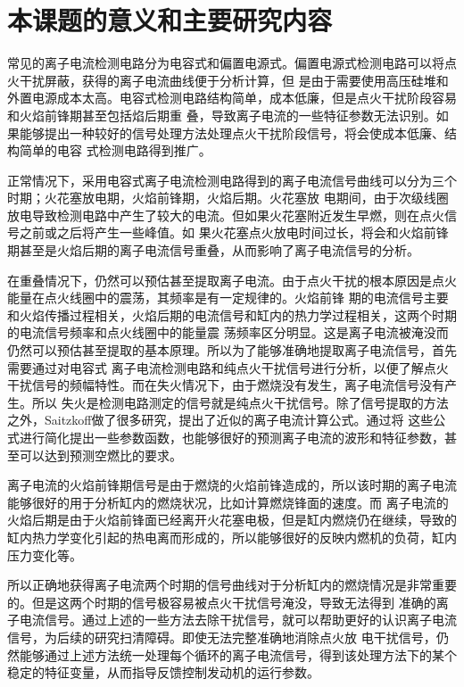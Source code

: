 \section{本课题的意义和主要研究内容}
常见的离子电流检测电路分为电容式和偏置电源式。偏置电源式检测电路可以将点火干扰屏蔽，获得的离子电流曲线便于分析计算\cite{cyb2012}，但
是由于需要使用高压硅堆和外置电源成本太高。电容式检测电路结构简单，成本低廉，但是点火干扰阶段容易和火焰前锋期甚至包括焰后期重
叠，导致离子电流的一些特征参数无法识别。如果能够提出一种较好的信号处理方法处理点火干扰阶段信号，将会使成本低廉、结构简单的电容
式检测电路得到推广。
\par 正常情况下，采用电容式离子电流检测电路得到的离子电流信号曲线可以分为三个时期；火花塞放电期，火焰前锋期，火焰后期。火花塞放
电期间，由于次级线圈放电导致检测电路中产生了较大的电流。但如果火花塞附近发生早燃，则在点火信号之前或之后将产生一些峰值\cite{eriksson1997closed}。如
果火花塞点火放电时间过长，将会和火焰前锋期甚至是火焰后期的离子电流信号重叠，从而影响了离子电流信号的分析。
\par 在重叠情况下，仍然可以预估甚至提取离子电流。由于点火干扰的根本原因是点火能量在点火线圈中的震荡，其频率是有一定规律的。火焰前锋
期的电流信号主要和火焰传播过程相关，火焰后期的电流信号和缸内的热力学过程相关，这两个时期的电流信号频率和点火线圈中的能量震
荡频率区分明显。这是离子电流被淹没而仍然可以预估甚至提取的基本原理。所以为了能够准确地提取离子电流信号，首先需要通过对电容式
离子电流检测电路和纯点火干扰信号进行分析，以便了解点火干扰信号的频幅特性。而在失火情况下，由于燃烧没有发生，离子电流信号没有产生。所以
失火是检测电路测定的信号就是纯点火干扰信号。除了信号提取的方法之外，Saitzkoff\cite{saitzkoff1996ionization}做了很多研究，提出了近似的离子电流计算公式。通过将
这些公式进行简化提出一些参数函数，也能够很好的预测离子电流的波形和特征参数，甚至可以达到预测空燃比的要求。
\par 离子电流的火焰前锋期信号是由于燃烧的火焰前锋造成的，所以该时期的离子电流能够很好的用于分析缸内的燃烧状况，比如计算燃烧锋面的速度。而
离子电流的火焰后期是由于火焰前锋面已经离开火花塞电极，但是缸内燃烧仍在继续，导致的缸内热力学变化引起的热电离而形成的，所以能够很好的反映内燃机的负荷，缸内压力变化等。
\par 所以正确地获得离子电流两个时期的信号曲线对于分析缸内的燃烧情况是非常重要的。但是这两个时期的信号极容易被点火干扰信号淹没，导致无法得到
准确的离子电流信号。通过上述的一些方法去除干扰信号，就可以帮助更好的认识离子电流信号，为后续的研究扫清障碍。即使无法完整准确地消除点火放
电干扰信号，仍然能够通过上述方法统一处理每个循环的离子电流信号，得到该处理方法下的某个稳定的特征变量，从而指导反馈控制发动机的运行参数。
